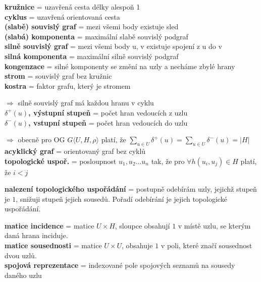 \documentclass[12pt]{article}
\begin{document}
\noindent
\textbf{kružnice} = uzavřená cesta délky alespoň 1\\
\textbf{cyklus} = uzavřená orientovaná cesta\\

\noindent
\textbf{(slabě) souvislý graf} = mezi všemi body existuje sled\\
\textbf{(slabá) komponenta} = maximální slabě souvislý podgraf\\
\textbf{silně souvislý graf} = mezi všemi body u, v existuje spojení z u do v\\
\textbf{silná komponenta} = maximální silně souvislý podgraf\\

\noindent
\textbf{kongenzace} = silné komponenty se změní na uzly a necháme zbylé hrany\\
\textbf{strom} = souvislý graf bez kružnic\\
\textbf{kostra} = faktor grafu, který je stromem

$\Rightarrow$ silně souvislý graf má každou hranu v cyklu\\

\noindent
\textbf{$\delta^+(u)$, výstupní stupeň} = počet hran vedoucích z uzlu\\
\textbf{$\delta^-(u)$, vstupní stupeň} = počet hran vedoucích do uzlu

$\Rightarrow$ obecně pro OG $G\langle U, H, \rho\rangle$ platí, že $\displaystyle \sum_{u\in U} \delta^+(u) = \sum_{u\in U} \delta^-(u) = \left| H\right|$\\

\noindent
\textbf{acyklický graf} = orientovaný graf bez cyklů\\
\textbf{topologické uspoř.} = posloupnost $u_1, u_2 \ldots u_n$ tak, že pro $\forall h(u_i, u_j) \in H$ platí, že $i<j$

\noindent
\textbf{nalezení topologického uspořádání} = postupně odebírám uzly, jejichž stupeň je $1$, snižuji stupeň jejich sousedů. Pořadí odebírání je jejich topologické uspořádání.

\noindent
\textbf{matice incidence} = matice $U \times H$, sloupce obsahují $1$ v místě uzlu, se kterým daná hrana inciduje.\\
\textbf{matice sousednosti} = matice $U \times U$, obsahuje $1$ v poli, které značí sousednost dvou uzlů.\\
\textbf{spojová reprezentace} = indexované pole spojových seznamů na sousedy daného uzlu\\
\end{document}
